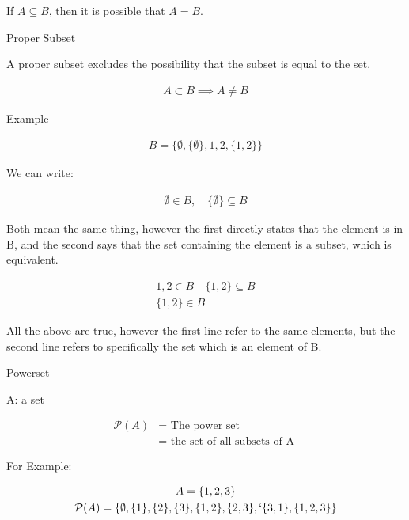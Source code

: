 \documentclass{report}
\begin{document}
\begin{description}
        If $A \subseteq B$, then it is possible that $A = B$.

    \item {\large Proper Subset}

        A proper subset excludes the possibility that the
        subset is equal to the set.

        \begin{gather}
           A \subset B \implies A \neq B 
        \end{gather}
    
    \item {\large Example}

        \begin{gather}
            B = \{ \emptyset, \{ \emptyset \}, 1, 2, \{1, 2 \} \} 
        \end{gather}
        
        We can write:

        \begin{gather}
            \emptyset \in B, \quad \{\emptyset \} \subseteq B 
        \end{gather}

        Both mean the same thing, however the first directly states
        that the element is in B, and the second says that the
        set containing the element is a subset, which is equivalent.


        \begin{gather}
            1, 2 \in B \quad \{ 1, 2 \} \subseteq B \\ 
            \{ 1, 2 \} \in B
        \end{gather}

        All the above are true, however the first line
        refer to the same elements, but the second line refers
        to specifically the set which is an element of B.


    \item {\large Powerset}

        A: a set

        \begin{align}
            \mathcal{P}(A) &= \text{ The power set} \\ 
            &= \text{ the set of all subsets of A }
        \end{align}

        For Example:

        \begin{gather}
            A = \{1, 2, 3\}\\
            \mathcal{P}(A) = \{\emptyset, \{ 1 \}, 
                \{ 2 \}, \{ 3 \}, \{1, 2\}, \{2, 3 \},
            `\{3, 1\}, \{1, 2, 3\}\}
        \end{gather}
       

\end{description}
\end{document}

